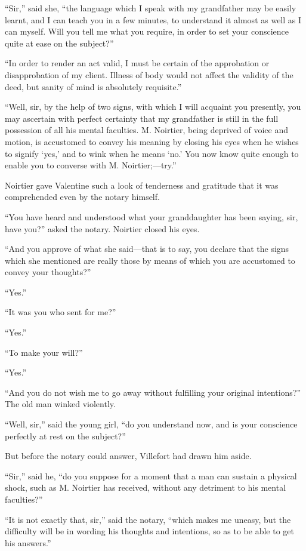 “Sir,” said she, “the language which I speak with my grandfather may be
easily learnt, and I can teach you in a few minutes, to understand it
almost as well as I can myself. Will you tell me what you require, in
order to set your conscience quite at ease on the subject?”

“In order to render an act valid, I must be certain of the approbation
or disapprobation of my client. Illness of body would not affect the
validity of the deed, but sanity of mind is absolutely requisite.”

“Well, sir, by the help of two signs, with which I will acquaint you
presently, you may ascertain with perfect certainty that my grandfather
is still in the full possession of all his mental faculties. M.
Noirtier, being deprived of voice and motion, is accustomed to convey
his meaning by closing his eyes when he wishes to signify ‘yes,’ and to
wink when he means ‘no.’ You now know quite enough to enable you to
converse with M. Noirtier;—try.”

Noirtier gave Valentine such a look of tenderness and gratitude that it
was comprehended even by the notary himself.

“You have heard and understood what your granddaughter has been saying,
sir, have you?” asked the notary. Noirtier closed his eyes.

“And you approve of what she said—that is to say, you declare that the
signs which she mentioned are really those by means of which you are
accustomed to convey your thoughts?”

“Yes.”

“It was you who sent for me?”

“Yes.”

“To make your will?”

“Yes.”

“And you do not wish me to go away without fulfilling your original
intentions?” The old man winked violently.

“Well, sir,” said the young girl, “do you understand now, and is your
conscience perfectly at rest on the subject?”

But before the notary could answer, Villefort had drawn him aside.

“Sir,” said he, “do you suppose for a moment that a man can sustain a
physical shock, such as M. Noirtier has received, without any detriment
to his mental faculties?”

“It is not exactly that, sir,” said the notary, “which makes me uneasy,
but the difficulty will be in wording his thoughts and intentions, so
as to be able to get his answers.”

